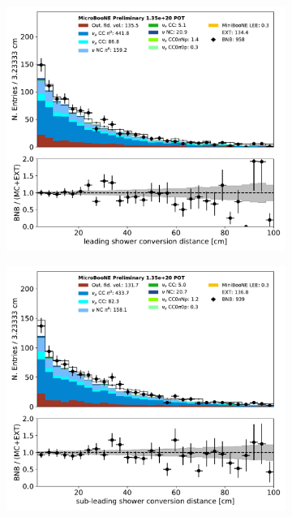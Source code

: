 \documentclass[a4paper]{article}
\begin{document}
\begin{figure}[H]
\begin{center}
    \begin{subfigure}[b]{0.38\textwidth}
    \centering
    \includegraphics[width=1.00\textwidth]{pi0/pi0_radlen1_01152020_inputs_RUN1.pdf}
    \end{subfigure}
    \begin{subfigure}[b]{0.38\textwidth}
    \centering
    \includegraphics[width=1.00\textwidth]{pi0/pi0_radlen2_01152020_inputs_RUN1.pdf}
    \end{subfigure}
    

\end{center}
\end{figure}
\end{document}
